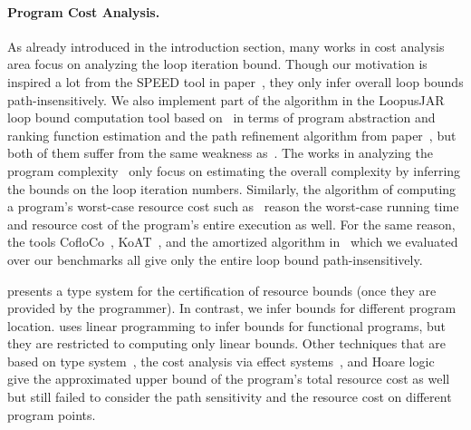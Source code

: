 \paragraph{Program Cost Analysis.}
As already introduced in the introduction section, many works in cost analysis area focus on analyzing the loop iteration bound.
Though our motivation is inspired a lot from the SPEED tool in paper~\cite{GulwaniZ10}, they only infer overall loop bounds path-insensitively.
We also implement part of the algorithm in the LoopusJAR loop bound computation tool based on~\cite{SinnZV17} in terms of program abstraction and ranking function estimation
and the path refinement algorithm from paper~\cite{GulwaniJK09}, but both of them suffer from the same weakness as~\cite{GulwaniZ10}.
The works in analyzing the program complexity~\cite{GustafssonEL05, HumenbergerJK18} only focus on estimating 
the overall complexity 
by inferring the bounds on the loop iteration numbers.
Similarly, the algorithm of computing a program's worst-case resource cost
such as~\cite{AlbertAGP08, AliasDFG10} reason the worst-case running time and resource cost of the program's entire execution as well.
For the same reason, the tools CofloCo~\cite{Montoya17, Flores-MontoyaH14, Flores-Montoya16}, KoAT~\cite{BrockschmidtEFFG16, BrockschmidtEFFG14, FalkeKS12, FalkeKS11}, and the amortized algorithm in~\cite{LuCT21} which we evaluated over our benchmarks all give only the entire loop bound path-insensitively.

\cite{CraryW00} presents a type system for the certification of resource bounds (once they are provided by the programmer). In contrast, we infer bounds for different program location. 
\cite{JostHLH10} uses linear programming to infer bounds for functional programs, but they are restricted to computing only linear bounds.
Other techniques that are based on
type system~\cite{CicekBG0H17, RajaniG0021}, the cost analysis via effect systems~\cite{CicekBG0H17, RadicekBG0Z18, QuG019}, and Hoare logic~\cite{CarbonneauxHS15}
give the approximated upper bound of the program's total resource cost as well but still failed to consider the path sensitivity and the resource cost on different program points.

